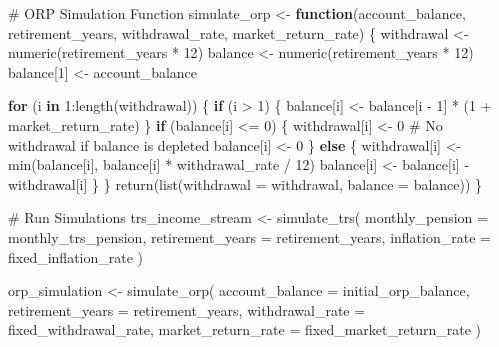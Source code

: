\documentclass[
  letterpaper,
  DIV=11,
  numbers=noendperiod]{scrartcl}
\newenvironment{Shaded}{\begin{snugshade}}{\end{snugshade}}
\newcommand{\AttributeTok}[1]{\textcolor[rgb]{0.40,0.45,0.13}{#1}}
\newcommand{\CommentTok}[1]{\textcolor[rgb]{0.37,0.37,0.37}{#1}}
\newcommand{\ControlFlowTok}[1]{\textcolor[rgb]{0.00,0.23,0.31}{\textbf{#1}}}
\newcommand{\DecValTok}[1]{\textcolor[rgb]{0.68,0.00,0.00}{#1}}
\newcommand{\FunctionTok}[1]{\textcolor[rgb]{0.28,0.35,0.67}{#1}}
\newcommand{\NormalTok}[1]{\textcolor[rgb]{0.00,0.23,0.31}{#1}}
\newcommand{\OtherTok}[1]{\textcolor[rgb]{0.00,0.23,0.31}{#1}}
\newcommand{\SpecialCharTok}[1]{\textcolor[rgb]{0.37,0.37,0.37}{#1}}
\begin{document}
\begin{Shaded}
\begin{Highlighting}[]
\CommentTok{\# ORP Simulation Function}
\NormalTok{simulate\_orp }\OtherTok{\textless{}{-}} \ControlFlowTok{function}\NormalTok{(account\_balance, retirement\_years, withdrawal\_rate, market\_return\_rate) \{}
\NormalTok{  withdrawal }\OtherTok{\textless{}{-}} \FunctionTok{numeric}\NormalTok{(retirement\_years }\SpecialCharTok{*} \DecValTok{12}\NormalTok{)}
\NormalTok{  balance }\OtherTok{\textless{}{-}} \FunctionTok{numeric}\NormalTok{(retirement\_years }\SpecialCharTok{*} \DecValTok{12}\NormalTok{)}
\NormalTok{  balance[}\DecValTok{1}\NormalTok{] }\OtherTok{\textless{}{-}}\NormalTok{ account\_balance}
  
  \ControlFlowTok{for}\NormalTok{ (i }\ControlFlowTok{in} \DecValTok{1}\SpecialCharTok{:}\FunctionTok{length}\NormalTok{(withdrawal)) \{}
    \ControlFlowTok{if}\NormalTok{ (i }\SpecialCharTok{\textgreater{}} \DecValTok{1}\NormalTok{) \{}
\NormalTok{      balance[i] }\OtherTok{\textless{}{-}}\NormalTok{ balance[i }\SpecialCharTok{{-}} \DecValTok{1}\NormalTok{] }\SpecialCharTok{*}\NormalTok{ (}\DecValTok{1} \SpecialCharTok{+}\NormalTok{ market\_return\_rate)}
\NormalTok{    \}}
    \ControlFlowTok{if}\NormalTok{ (balance[i] }\SpecialCharTok{\textless{}=} \DecValTok{0}\NormalTok{) \{}
\NormalTok{      withdrawal[i] }\OtherTok{\textless{}{-}} \DecValTok{0}  \CommentTok{\# No withdrawal if balance is depleted}
\NormalTok{      balance[i] }\OtherTok{\textless{}{-}} \DecValTok{0}
\NormalTok{    \} }\ControlFlowTok{else}\NormalTok{ \{}
\NormalTok{      withdrawal[i] }\OtherTok{\textless{}{-}} \FunctionTok{min}\NormalTok{(balance[i], balance[i] }\SpecialCharTok{*}\NormalTok{ withdrawal\_rate }\SpecialCharTok{/} \DecValTok{12}\NormalTok{)}
\NormalTok{      balance[i] }\OtherTok{\textless{}{-}}\NormalTok{ balance[i] }\SpecialCharTok{{-}}\NormalTok{ withdrawal[i]}
\NormalTok{    \}}
\NormalTok{  \}}
  \FunctionTok{return}\NormalTok{(}\FunctionTok{list}\NormalTok{(}\AttributeTok{withdrawal =}\NormalTok{ withdrawal, }\AttributeTok{balance =}\NormalTok{ balance))}
\NormalTok{\}}

\CommentTok{\# Run Simulations}
\NormalTok{trs\_income\_stream }\OtherTok{\textless{}{-}} \FunctionTok{simulate\_trs}\NormalTok{(}
  \AttributeTok{monthly\_pension =}\NormalTok{ monthly\_trs\_pension,}
  \AttributeTok{retirement\_years =}\NormalTok{ retirement\_years,}
  \AttributeTok{inflation\_rate =}\NormalTok{ fixed\_inflation\_rate}
\NormalTok{)}

\NormalTok{orp\_simulation }\OtherTok{\textless{}{-}} \FunctionTok{simulate\_orp}\NormalTok{(}
  \AttributeTok{account\_balance =}\NormalTok{ initial\_orp\_balance,}
  \AttributeTok{retirement\_years =}\NormalTok{ retirement\_years,}
  \AttributeTok{withdrawal\_rate =}\NormalTok{ fixed\_withdrawal\_rate,}
  \AttributeTok{market\_return\_rate =}\NormalTok{ fixed\_market\_return\_rate}
\NormalTok{)}


\end{Highlighting}
\end{Shaded}
\end{document}
